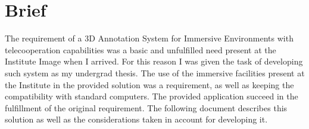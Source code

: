 \chapter{Brief}
The requirement of a 3D Annotation System for Immersive Environments with telecooperation capabilities was a basic and unfulfilled need present at the Institute Image when I arrived. For this reason I was given the task of developing such system as my undergrad thesis. The use of the immersive facilities present at the Institute in the provided solution was a requirement, as well as keeping the compatibility with standard computers. The provided application succeed in the fulfillment of the original requirement. The following document describes this solution as well as the considerations taken in account for developing it.